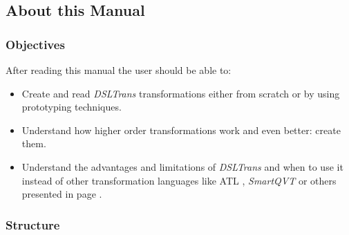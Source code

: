 \clearpage

\subsection{About this Manual}


\subsubsection{Objectives}

After reading this manual the user should be able to:

\begin{itemize}
  \item Create and read \emph{DSLTrans} transformations either from scratch or by using
  prototyping techniques.
  \item Understand how higher order transformations work and even
  better: create them.
  \item Understand the advantages and limitations of \emph{DSLTrans} and
  when to use it instead of other transformation languages like ATL
  \cite{atl_transformation_tool}, \emph{SmartQVT}
  \cite{qvt_transformation_language} or others presented in page
  \pageref{subsubsec:other_languages}.
\end{itemize}




\subsubsection{Structure}

